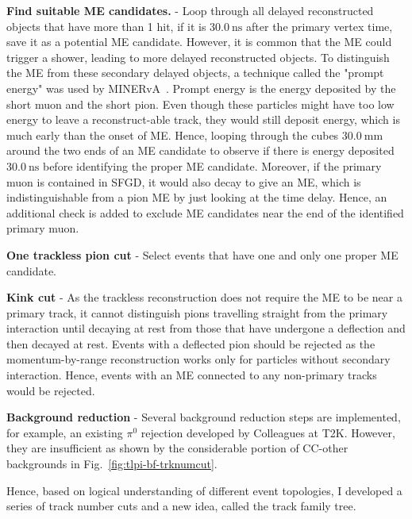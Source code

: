             \textbf{Find suitable ME candidates.} - Loop through all delayed reconstructed objects that have more than 1 hit, if it is $30.0~\textrm{ns}$ after the primary vertex time, save it as a potential ME candidate. 
            However, it is common that the ME could trigger a shower, leading to more delayed reconstructed objects. 
            To distinguish the ME from these secondary delayed objects, a technique called the "prompt energy" was used by MINERvA~\cite{Zhang2016}. 
            Prompt energy is the energy deposited by the short muon and the short pion. 
            Even though these particles might have too low energy to leave a reconstruct-able track, they would still deposit energy, which is much early than the onset of ME. 
            Hence, looping through the cubes $30.0~\textrm{mm}$ around the two ends of an ME candidate to observe if there is energy deposited $30.0~\textrm{ns}$ before identifying the proper ME candidate. 
            Moreover, if the primary muon is contained in SFGD, it would also decay to give an ME, which is indistinguishable from a pion ME by just looking at the time delay. 
            Hence, an additional check is added to exclude ME candidates near the end of the identified primary muon. 
        
            \textbf{One trackless pion cut} - Select events that have one and only one proper ME candidate.
        
            \textbf{Kink cut} - As the trackless reconstruction does not require the ME to be near a primary track, it cannot distinguish pions travelling straight from the primary interaction until decaying at rest from those that have undergone a deflection and then decayed at rest. 
            Events with a deflected pion should be rejected as the momentum-by-range reconstruction works only for particles without secondary interaction. 
            Hence, events with an ME connected to any non-primary tracks would be rejected.
        
            \textbf{Background reduction} - Several background reduction steps are implemented, for example, an existing $\pi^0$ rejection developed by Colleagues at T2K.
            However, they are insufficient as shown by the considerable portion of CC-other backgrounds in Fig.~\ref{fig:tlpi-bf-trknumcut}.


            Hence, based on logical understanding of different event topologies, I developed a series of track number cuts and a new idea, called the track family tree.
            
